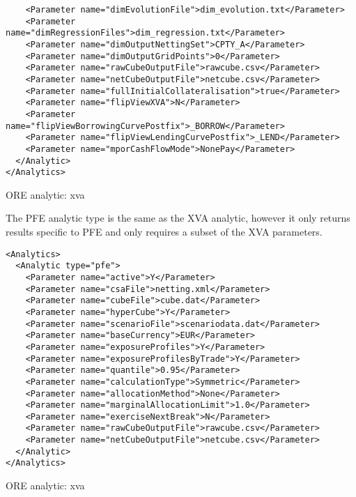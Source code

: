 {\begin{listing}[H]
\begin{verbatim}
    <Parameter name="dimEvolutionFile">dim_evolution.txt</Parameter>
    <Parameter name="dimRegressionFiles">dim_regression.txt</Parameter>
    <Parameter name="dimOutputNettingSet">CPTY_A</Parameter>      
    <Parameter name="dimOutputGridPoints">0</Parameter>
    <Parameter name="rawCubeOutputFile">rawcube.csv</Parameter>
    <Parameter name="netCubeOutputFile">netcube.csv</Parameter>
    <Parameter name="fullInitialCollateralisation">true</Parameter>
    <Parameter name="flipViewXVA">N</Parameter>
    <Parameter name="flipViewBorrowingCurvePostfix">_BORROW</Parameter>
    <Parameter name="flipViewLendingCurvePostfix">_LEND</Parameter>
    <Parameter name="mporCashFlowMode">NonePay</Parameter>
  </Analytic>
</Analytics>
\end{verbatim}
\caption{ORE analytic: xva}
\label{lst:ore_xva}
\end{listing}

The PFE analytic type is the same as the XVA analytic, however it only returns results specific to PFE and only requires a subset of the XVA parameters.

\begin{listing}[H]
\begin{verbatim}
<Analytics>
  <Analytic type="pfe">
    <Parameter name="active">Y</Parameter>
    <Parameter name="csaFile">netting.xml</Parameter>
    <Parameter name="cubeFile">cube.dat</Parameter>
    <Parameter name="hyperCube">Y</Parameter>
    <Parameter name="scenarioFile">scenariodata.dat</Parameter>
    <Parameter name="baseCurrency">EUR</Parameter>
    <Parameter name="exposureProfiles">Y</Parameter>
    <Parameter name="exposureProfilesByTrade">Y</Parameter>
    <Parameter name="quantile">0.95</Parameter>
    <Parameter name="calculationType">Symmetric</Parameter>
    <Parameter name="allocationMethod">None</Parameter>
    <Parameter name="marginalAllocationLimit">1.0</Parameter>
    <Parameter name="exerciseNextBreak">N</Parameter>
    <Parameter name="rawCubeOutputFile">rawcube.csv</Parameter>
    <Parameter name="netCubeOutputFile">netcube.csv</Parameter>
  </Analytic>
</Analytics>
\end{verbatim}
\caption{ORE analytic: xva}
\label{lst:ore_xva}
\end{listing}

}

